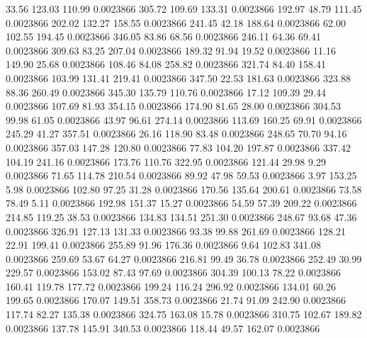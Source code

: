      33.56    123.03    110.99  0.0023866
    305.72    109.69    133.31  0.0023866
    192.97     48.79    111.45  0.0023866
    202.02    132.27    158.55  0.0023866
    241.45     42.18    188.64  0.0023866
     62.00    102.55    194.45  0.0023866
    346.05     83.86     68.56  0.0023866
    246.11     64.36     69.41  0.0023866
    309.63     83.25    207.04  0.0023866
    189.32     91.94     19.52  0.0023866
     11.16    149.90     25.68  0.0023866
    108.46     84.08    258.82  0.0023866
    321.74     84.40    158.41  0.0023866
    103.99    131.41    219.41  0.0023866
    347.50     22.53    181.63  0.0023866
    323.88     88.36    260.49  0.0023866
    345.30    135.79    110.76  0.0023866
     17.12    109.39     29.44  0.0023866
    107.69     81.93    354.15  0.0023866
    174.90     81.65     28.00  0.0023866
    304.53     99.98     61.05  0.0023866
     43.97     96.61    274.14  0.0023866
    113.69    160.25     69.91  0.0023866
    245.29     41.27    357.51  0.0023866
     26.16    118.90     83.48  0.0023866
    248.65     70.70     94.16  0.0023866
    357.03    147.28    120.80  0.0023866
     77.83    104.20    197.87  0.0023866
    337.42    104.19    241.16  0.0023866
    173.76    110.76    322.95  0.0023866
    121.44     29.98      9.29  0.0023866
     71.65    114.78    210.54  0.0023866
     89.92     47.98     59.53  0.0023866
      3.97    153.25      5.98  0.0023866
    102.80     97.25     31.28  0.0023866
    170.56    135.64    200.61  0.0023866
     73.58     78.49      5.11  0.0023866
    192.98    151.37     15.27  0.0023866
     54.59     57.39    209.22  0.0023866
    214.85    119.25     38.53  0.0023866
    134.83    134.51    251.30  0.0023866
    248.67     93.68     47.36  0.0023866
    326.91    127.13    131.33  0.0023866
     93.38     99.88    261.69  0.0023866
    128.21     22.91    199.41  0.0023866
    255.89     91.96    176.36  0.0023866
      9.64    102.83    341.08  0.0023866
    259.69     53.67     64.27  0.0023866
    216.81     99.49     36.78  0.0023866
    252.49     30.99    229.57  0.0023866
    153.02     87.43     97.69  0.0023866
    304.39    100.13     78.22  0.0023866
    160.41    119.78    177.72  0.0023866
    199.24    116.24    296.92  0.0023866
    134.01     60.26    199.65  0.0023866
    170.07    149.51    358.73  0.0023866
     21.74     91.09    242.90  0.0023866
    117.74     82.27    135.38  0.0023866
    324.75    163.08     15.78  0.0023866
    310.75    102.67    189.82  0.0023866
    137.78    145.91    340.53  0.0023866
    118.44     49.57    162.07  0.0023866

